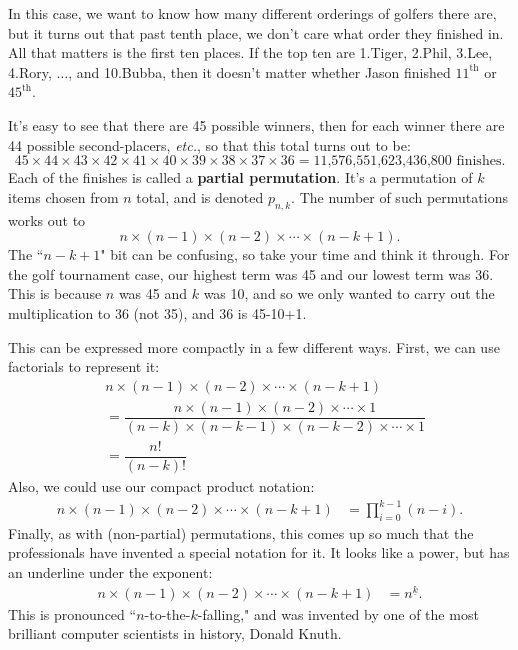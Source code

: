 In this case, we want to know how many different orderings of golfers there
are, but it turns out that past tenth place, we don't care what order they
finished in. All that matters is the first ten places. If the top ten are
1.Tiger, 2.Phil, 3.Lee, 4.Rory, $\dots$, and 10.Bubba, then it doesn't
matter whether Jason finished $11^{\text{th}}$ or $45^{\text{th}}$.

It's easy to see that there are 45 possible winners, then for each winner
there are 44 possible second-placers, \textit{etc.}, so that this total
turns out to be:
{\small
\[
45 \times 44 \times 43 \times 42 \times 41 \times 40 \times 39 \times 38
\times 37 \times 36 = \text{11,576,551,623,436,800 finishes}.
\]
}
Each of the finishes is called a \textbf{partial permutation}. It's a
permutation of $k$ items chosen from $n$ total, and is denoted $p_{n,k}$.
The number of such permutations works out to
\[
n \times (n-1) \times (n-2) \times \cdots \times (n-k+1).
\]
The ``$n-k+1$" bit can be confusing, so take your time and think it
through. For the golf tournament case, our highest term was 45 and our
lowest term was 36. This is because $n$ was 45 and $k$ was 10, and so we
only wanted to carry out the multiplication to 36 (not 35), and 36 is
45-10+1.

This can be expressed more compactly in a few different ways. First,
we can use factorials to represent it:
\begin{align*}
& n \times (n-1) \times (n-2) \times \cdots \times (n-k+1) \\
&= \dfrac{n \times (n-1) \times (n-2) \times \cdots \times 1}{(n-k) \times (n-k-1) \times (n-k-2) \times \cdots \times 1} \\
&= \dfrac{n!}{(n-k)!}
\end{align*}
Also, we could use our compact product notation:
\begin{align*}
n \times (n-1) \times (n-2) \times \cdots \times (n-k+1) &= 
\prod_{i=0}^{k-1}{(n-i)}.
\end{align*}
Finally, as with (non-partial) permutations, this comes up so much that
the professionals have invented a special notation for it. It looks like a
power, but has an underline under the exponent:
\begin{align*}
n \times (n-1) \times (n-2) \times \cdots \times (n-k+1) &= 
n^{\underline{k}}.
\end{align*}
This is pronounced ``$n$-to-the-$k$-falling," and was invented by one of
the most brilliant computer scientists in history, Donald Knuth.

